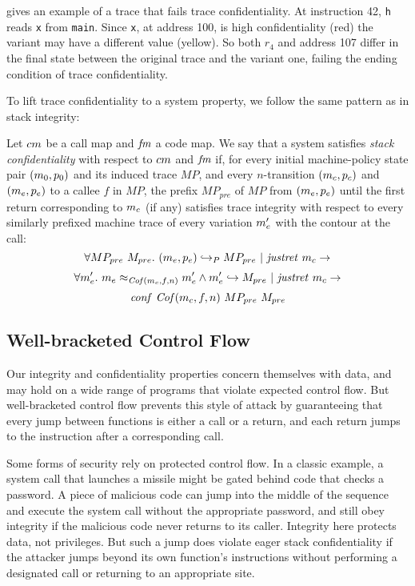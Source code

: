 \documentclass[acmsmall,review,anonymous]{acmart}\settopmatter{printfolios=true,printccs=false,printacmref=false}
\begin{document}
 gives an example of a trace that fails trace
confidentiality. At instruction 42, {\tt h} reads {\tt x} from {\tt main}.
Since {\tt x}, at address 100, is high confidentiality (red) the variant
may have a different value (yellow). So both \(r_4\) and address 107
differ in the final state between the original trace and the variant one,
failing the ending condition of trace confidentiality.

To lift trace confidentiality to a system property, we follow the same
pattern as in stack integrity:

Let $cm$ be a call map and $\mathit{fm}$ a code map. We say that a
system satisfies {\em stack confidentiality} with respect to
$cm$ and $\mathit{fm}$ if, for every initial machine-policy state
pair $(m_0, p_0)$ and its induced trace $MP$, and every
$n$-transition $(m_c, p_c)$ and $(m_e, p_e)$ to a callee
$f$ in $MP$, the prefix $MP_{pre}$ of $MP$ from $(m_e, p_e)$
until the first return corresponding to $m_c$ (if any) satisfies
trace integrity with respect to every similarly prefixed machine trace
of every variation $m_e'$ with the contour at the call:
$$\forall MP_{pre} ~ M_{pre}. ~
(m_e,p_e) \hookrightarrow_P MP_{pre} ~ | ~ \mathit{justret}\ m_c \rightarrow$$
$$\forall m_e'. ~ m_e \approx_{\mathit{Cof}(m_c, f, n)} m_e' \wedge
m_e' \hookrightarrow M_{pre} ~ | ~ \mathit{justret}\ m_c \rightarrow$$
$$\mathit{conf}~\mathit{Cof}(m_c, f, n) ~ MP_{pre} ~ M_{pre}$$

\subsection{Well-bracketed Control Flow}
\label{sec:wbcf}

Our integrity and confidentiality properties concern themselves with
data, and may hold on a wide range of programs that violate expected
control flow.  But well-bracketed control flow prevents this style of
attack by guaranteeing that every jump between functions is either a
call or a return, and each return jumps to the instruction after a
corresponding call.

    Some forms of security rely on protected control flow. In a classic
    example, a system call that launches a missile might be gated behind code
    that checks a password. A piece of malicious code can jump into the middle
    of the sequence and execute the system call without the appropriate password,
    and still obey integrity if the malicious code never returns to its caller.
    Integrity here protects data, not privileges. But such a jump does violate
    eager stack confidentiality if the attacker jumps beyond its own function's
    instructions without performing a designated call or returning to an
    appropriate site.
\end{document}
